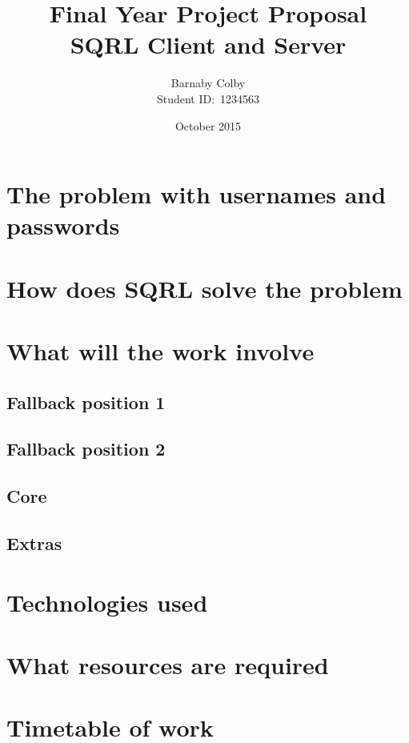 \documentclass[a4paper]{article}
\begin{document}
\title{Final Year Project Proposal\\SQRL Client and Server}
\author{Barnaby Colby\\
Student ID:\ 1234563}
\date{October 2015}
\maketitle



\section*{The problem with usernames and passwords} 
\section*{How does SQRL solve the problem} 
\section*{What will the work involve} 
    \subsection*{Fallback position 1} 
    \subsection*{Fallback position 2} 
    \subsection*{Core} 
    \subsection*{Extras} 
\section*{Technologies used} 
\section*{What resources are required}
\section*{Timetable of work}
\end{document}
